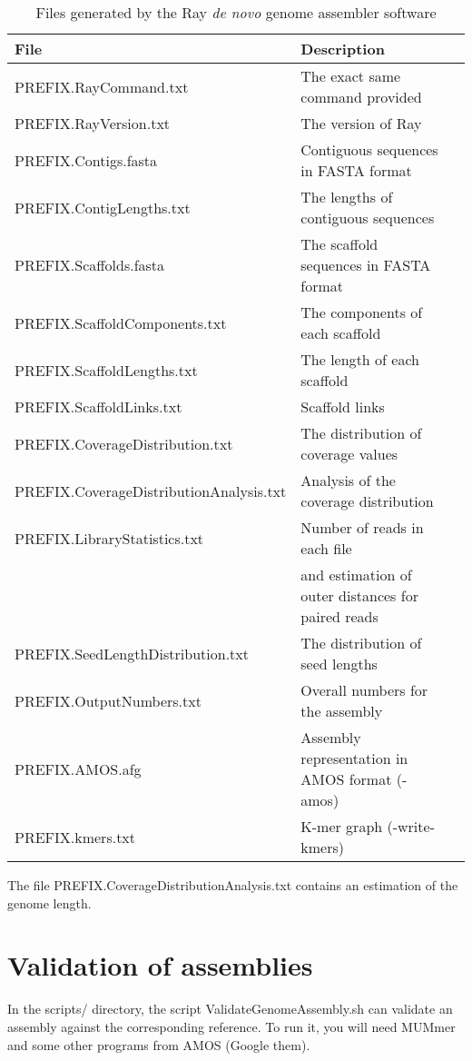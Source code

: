 \documentclass{article}
\begin{document}
\begin{table}[h]
\caption{Files generated by the Ray \emph{de novo} genome assembler software}\label{outputs}
\begin{tabular}{lll}
\hline
File& Description\\
\hline
PREFIX.RayCommand.txt & The exact same command provided \\
PREFIX.RayVersion.txt & The version of Ray\\
PREFIX.Contigs.fasta & Contiguous sequences in FASTA format\\
PREFIX.ContigLengths.txt & The lengths of contiguous sequences\\
PREFIX.Scaffolds.fasta & The scaffold sequences in FASTA format \\
PREFIX.ScaffoldComponents.txt & The components of each scaffold\\
PREFIX.ScaffoldLengths.txt & The length of each scaffold \\
PREFIX.ScaffoldLinks.txt & Scaffold links \\
PREFIX.CoverageDistribution.txt & The distribution of coverage values \\
PREFIX.CoverageDistributionAnalysis.txt & Analysis of the coverage distribution \\
PREFIX.LibraryStatistics.txt & Number of reads in each file \\
 & and estimation of outer distances for paired reads \\
PREFIX.SeedLengthDistribution.txt & The distribution of seed lengths \\
PREFIX.OutputNumbers.txt & Overall numbers for the assembly\\
PREFIX.AMOS.afg & Assembly representation in AMOS format (-amos) \\
PREFIX.kmers.txt & K-mer graph (-write-kmers) \\
\hline
\end{tabular}
\end{table}

The file PREFIX.CoverageDistributionAnalysis.txt contains an estimation of the genome length.


\newpage

\section{Validation of assemblies}

In the scripts/ directory, the script ValidateGenomeAssembly.sh can validate an assembly against the corresponding
reference. To run it, you will need MUMmer and some other programs from AMOS (Google them).
\end{document}
